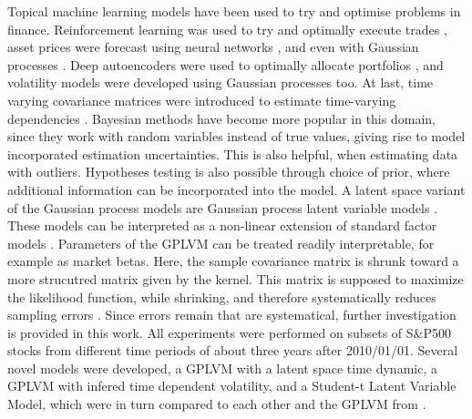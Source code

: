Topical machine learning models have been used to try and optimise problems in finance. Reinforcement learning was used to try and optimally execute trades \cite{Nevmyvaka_2006}, asset prices were forecast using neural networks \cite{Gately_1995}, and even with Gaussian processes \cite{Chapados_2008}. Deep autoencoders were used to optimally allocate portfolios \cite{Heaton_2018}, and volatility models were developed using Gaussian processes too. At last, time varying covariance matrices were introduced to estimate time-varying dependencies \cite{Wilson_2011}. Bayesian methods have become more popular in this domain, since they work with random variables instead of true values, giving rise to model incorporated estimation uncertainties. This is also helpful, when estimating data with outliers. Hypotheses testing is also possible through choice of prior, where additional information can be incorporated into the model. A latent space variant of the Gaussian process models are Gaussian process latent variable models \cite{Lawrence_2005}. These models can be interpreted as a non-linear extension of standard factor models \cite{Rasmussen_06}. Parameters of the GPLVM can be treated readily interpretable, for example as market betas. Here, the sample covariance matrix is shrunk toward a more strucutred matrix given by the kernel. This matrix is supposed to maximize the likelihood function, while shrinking, and therefore systematically reduces sampling errors \cite{Nirwan_2019}. Since errors remain that are systematical, further investigation is provided in this work. All experiments were performed on subsets of S\&P500 stocks from different time periods of about three years after 2010/01/01. Several novel models were developed, a GPLVM with a latent space time dynamic, a GPLVM with infered time dependent volatility, and a Student-t Latent Variable Model, which were in turn compared to each other and the GPLVM from \cite{Nirwan_2019}. 